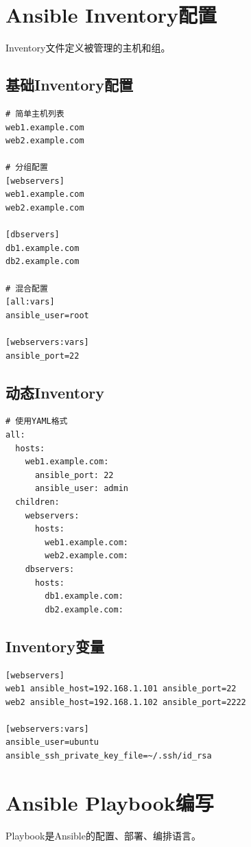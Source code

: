 \documentclass[12pt,UTF8]{ctexbook}
\begin{document}
\section{Ansible Inventory配置}
\label{sec:ansible-inventory}

Inventory文件定义被管理的主机和组。

\subsection*{基础Inventory配置}
\begin{lstlisting}
# 简单主机列表
web1.example.com
web2.example.com

# 分组配置
[webservers]
web1.example.com
web2.example.com

[dbservers]
db1.example.com
db2.example.com

# 混合配置
[all:vars]
ansible_user=root

[webservers:vars]
ansible_port=22
\end{lstlisting}

\subsection*{动态Inventory}
\begin{lstlisting}
# 使用YAML格式
all:
  hosts:
    web1.example.com:
      ansible_port: 22
      ansible_user: admin
  children:
    webservers:
      hosts:
        web1.example.com:
        web2.example.com:
    dbservers:
      hosts:
        db1.example.com:
        db2.example.com:
\end{lstlisting}

\subsection*{Inventory变量}
\begin{lstlisting}
[webservers]
web1 ansible_host=192.168.1.101 ansible_port=22
web2 ansible_host=192.168.1.102 ansible_port=2222

[webservers:vars]
ansible_user=ubuntu
ansible_ssh_private_key_file=~/.ssh/id_rsa
\end{lstlisting}

\section{Ansible Playbook编写}
\label{sec:ansible-playbook}

Playbook是Ansible的配置、部署、编排语言。
\end{document}
